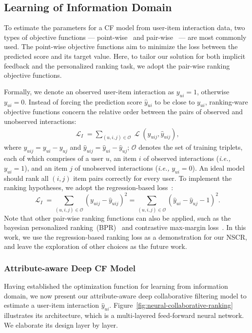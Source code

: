 \documentclass[sigconf]{acmart}
\newcommand{\Lapl}{\mathbf{\mathop{\mathcal{L}}}}
\newcommand{\Set}[1]{\mathcal{#1}}
\newcommand{\ie}{\emph{i.e., }}
\begin{document}
\subsection{Learning of Information Domain}
\label{ss:learning_information}
To estimate the parameters for a CF model from user-item interaction data, two types of objective functions --- point-wise~\cite{iCD,heneural} and pair-wise~\cite{DBLP:conf/uai/RendleFGS09,chen2017acf,RankALS} --- are most commonly used.
The point-wise objective functions aim to minimize the loss between the predicted score and its target value.
Here, to tailor our solution for both implicit feedback and the personalized ranking task, we adopt the pair-wise ranking objective functions.

Formally, we denote an observed user-item interaction as $y_{ui} = 1$, otherwise $y_{ui} = 0$. Instead of forcing the prediction score $\hat{y}_{ui}$ to be close to $y_{ui}$, ranking-ware objective functions concern the relative order between the pairs of observed and unobserved interactions:
\begin{gather}
\Lapl_I = \sum_{(u,i,j)\in\Set{O}}\Lapl(y_{uij},\hat{y}_{uij}),
\end{gather}
where $y_{uij}=y_{ui}-y_{uj}$ and $\hat{y}_{uij}=\hat{y}_{ui}-\hat{y}_{uj}$; $\Set{O}$ denotes the set of training triplets, each of which comprises of a user $u$, an item $i$ of observed interactions (\ie $y_{ui}=1$), and an item $j$ of unobserved interactions (\ie $y_{ui}=0$). An ideal model should rank all $(i,j)$ item pairs correctly for every user. To implement the ranking hypotheses, we adopt the regression-based loss~\cite{RankALS}:
\begin{equation}\label{equ:information-obj}
\Lapl_I=\sum_{(u,i,j)\in\Set{O}}(y_{uij}-\hat{y}_{uij})^{2} = \sum_{(u,i,j)\in\Set{O}} (\hat{y}_{ui} - \hat{y}_{uj} - 1)^2 .
\end{equation}
\noindent Note that other pair-wise ranking functions can also be applied, such as the bayesian personalized ranking~(BPR)~\cite{chen2017acf,DBLP:conf/uai/RendleFGS09} and contrastive max-margin loss~\cite{DBLP:conf/nips/SocherCMN13}. In this work, we use the regression-based ranking loss as a demonstration for our NSCR, and leave the exploration of other choices as the future work.

\subsubsection{\textbf{Attribute-aware Deep CF Model}}\label{sec:representation-learning}
Having established the optimization function for learning from information domain, we now present our attribute-aware deep collaborative filtering model to estimate a user-item interaction $\hat{y}_{ui}$. Figure~\ref{fig:neural-collaborative-ranking} illustrates its architecture, which is a multi-layered feed-forward neural network. We elaborate its design layer by layer.
\end{document}
